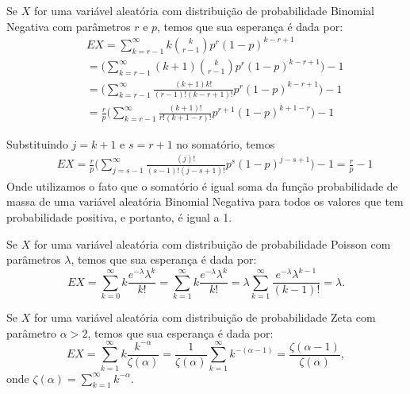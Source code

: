 \begin{frame}
\begin{exem}
Se $X$ for uma variável aleatória
com distribuição de probabilidade Binomial Negativa com parâmetros
$r$ e $p$, temos que sua esperança é dada por:
\begin{eqnarray}
& &
EX=\sum_{k=r-1}^{\infty}k\binom{k}{r-1}p^{r}(1-p)^{k-r+1}
\nonumber \\
& & =\Big(\sum_{k=r-1}^{\infty}(k+1)\binom{k}{r-1}p^{r}(1-p)^{k-r+1}\Big)-1
\nonumber\\
& &
=\Big(\sum_{k=r-1}^{\infty}\frac{(k+1)k!}{(r-1)!(k-r+1)!}p^r(1-p)^{k-r+1}\Big)-1\nonumber
\\
& &
=\frac{r}{p}\Big(\sum_{k=r-1}^{\infty}\frac{(k+1)!}{r!(k+1-r)!}p^{r+1}(1-p)^{k+1-r}\Big)-1\nonumber
\end{eqnarray}

Substituindo $j=k+1$ e $s=r+1$ no somatório, temos
\begin{eqnarray}
& & EX=
\frac{r}{p}\Big(\sum_{j=s-1}^{\infty}\frac{(j)!}{(s-1)!(j-s+1)!}p^{s}(1-p)^{j-s+1}\Big)-1\nonumber=\frac{r}{p}-1\nonumber
\end{eqnarray}
Onde utilizamos o fato que o somatório é igual soma da função
probabilidade de massa de uma variável aleatória Binomial Negativa
para todos os valores que tem probabilidade positiva, e portanto, é
igual a 1.


\end{exem}
\end{frame}
%
\begin{frame}
\begin{exem}[Poisson]
%
Se $X$ for uma variável aleatória
com distribuição de probabilidade Poisson com parâmetros $\lambda$,
temos que sua esperança é dada por:
$$EX=\sum_{k=0}^{\infty}k\frac{e^{-\lambda}\lambda^k}{k!}=\sum_{k=1}^{\infty}k\frac{e^{-\lambda}\lambda^k}{k!}=\lambda\sum_{k=1}^{\infty}\frac{e^{-\lambda}\lambda^{k-1}}{(k-1)!}=\lambda.$$

\end{exem}
%
\begin{exem}[Zeta]
%
Se $X$ for uma variável aleatória
com distribuição de probabilidade Zeta com parâmetro $\alpha>2$,
temos que sua esperança é dada por:
$$EX=\sum_{k=1}^{\infty}k\frac{k^{-\alpha}}{\zeta(\alpha)}=\frac{1}{\zeta(\alpha)}\sum_{k=1}^{\infty}k^{-(\alpha-1)}=\frac{\zeta(\alpha-1)}{\zeta(\alpha)},$$
onde $\zeta(\alpha)=\sum_{k=1}^{\infty}k^{-\alpha}$.

\end{exem}
\end{frame}
